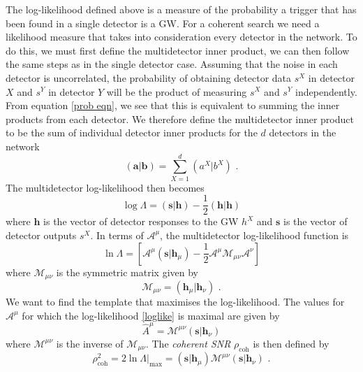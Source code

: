 \documentclass[11pt]{cuthesis}
\newcommand{\mn}{_{\mu\nu}}
\newcommand{\fs}{\text{ .}}
\begin{document}
The log-likelihood defined above is a measure of the probability a trigger that has been found in a single detector is a GW. For a coherent search we need a likelihood measure that takes into consideration every detector in the network. To do this, we must first define the multidetector inner product, we can then follow the same steps as in the single detector case. Assuming that the noise in each detector is uncorrelated, the probability of obtaining detector data $s^X$ in detector $X$ and $s^Y$ in detector $Y$ will be the product of measuring $s^X$ and $s^Y$ independently. From equation \ref{prob eqn}, we see that this is equivalent to summing the inner products from each detector. We therefore define the multidetector inner product to be the sum of individual detector inner products for the $d$ detectors in the network
\begin{equation}
(\textbf{a}|\textbf{b}) = \sum_{X=1}^d (a^X|b^X) \textbf{ .}
\end{equation}
The multidetector log-likelihood then becomes
\begin{equation}
\log \Lambda = (\textbf{s}|\textbf{h}) - \frac{1}{2}(\textbf{h}|\textbf{h}) \end{equation}
where $\textbf{h}$ is the vector of detector responses to the GW $h^X$ and $\textbf{s}$ is the vector of detector outputs $s^X$.
In terms of $\mathcal{A}^\mu$, the multidetector log-likelihood function is
\begin{equation} \label{loglike}
\ln \Lambda = \left[ \mathcal{A}^\mu(\textbf{s}|\textbf{h}_\mu) - \frac{1}{2}\mathcal{A}^\mu \mathcal{M}_{\mu\nu}\mathcal{A}^\nu \right]
\end{equation}
where $\mathcal{M}\mn$ is the symmetric matrix given by
\begin{equation}
\mathcal{M}_{\mu\nu} = (\textbf{h}_\mu|\textbf{h}_\nu) \fs
\end{equation}
We want to find the template that maximises the log-likelihood. The values for $\mathcal{A}^\mu$ for which the log-likelihood \ref{loglike} is maximal are given by
\begin{equation}
\hat{A}^\mu =\mathcal{M}^{\mu\nu}(\textbf{s}|\textbf{h}_\nu)
\end{equation}
where $\mathcal{M}^{\mu\nu}$ is the inverse of $\mathcal{M}_{\mu\nu}$. The \textit{coherent SNR} $\rho_\text{coh}$ is then defined by
\begin{equation} \label{rhocoh1}
\rho^2_\text{coh} = 2\ln \Lambda |_\text{max} = (\textbf{s}|\textbf{h}_\mu)\mathcal{M}^{\mu\nu}(\textbf{s}|\textbf{h}_\nu) \fs
\end{equation}
\end{document}
